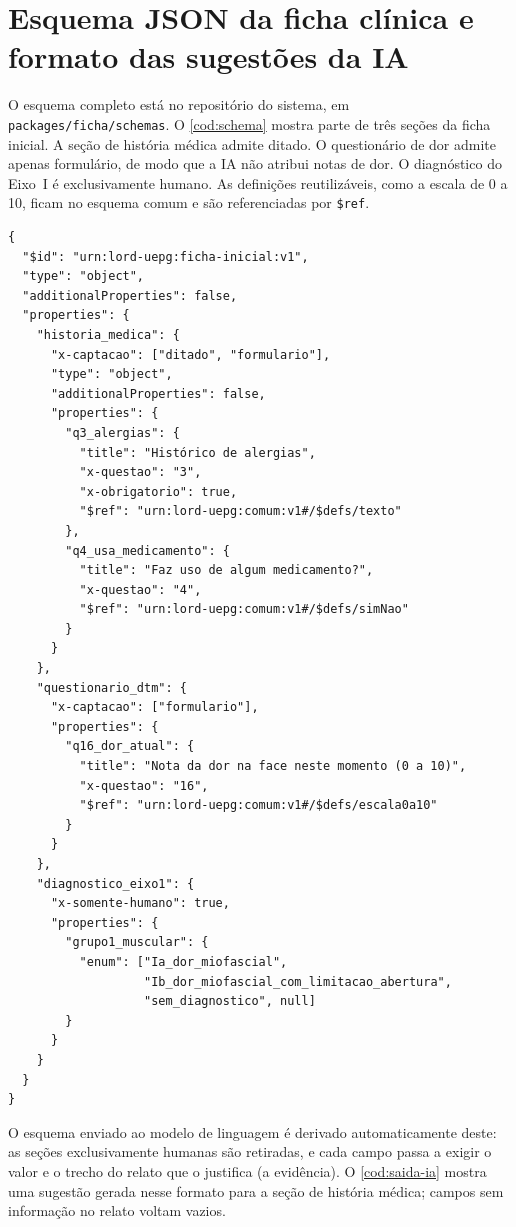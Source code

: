 \chapter{Esquema JSON da ficha clínica e formato das sugestões da IA}
\label{apendice:schema}

O esquema completo está no repositório do sistema, em \texttt{packages/ficha/schemas}. O \autoref{cod:schema} mostra parte de três seções da ficha inicial. A seção de história médica admite ditado. O questionário de dor admite apenas formulário, de modo que a IA não atribui notas de dor. O diagnóstico do Eixo~I é exclusivamente humano. As definições reutilizáveis, como a escala de 0 a 10, ficam no esquema comum e são referenciadas por \texttt{\$ref}.

\begin{lstlisting}[caption={Trecho do esquema da ficha inicial (versão 1)}, label=cod:schema]
{
  "$id": "urn:lord-uepg:ficha-inicial:v1",
  "type": "object",
  "additionalProperties": false,
  "properties": {
    "historia_medica": {
      "x-captacao": ["ditado", "formulario"],
      "type": "object",
      "additionalProperties": false,
      "properties": {
        "q3_alergias": {
          "title": "Histórico de alergias",
          "x-questao": "3",
          "x-obrigatorio": true,
          "$ref": "urn:lord-uepg:comum:v1#/$defs/texto"
        },
        "q4_usa_medicamento": {
          "title": "Faz uso de algum medicamento?",
          "x-questao": "4",
          "$ref": "urn:lord-uepg:comum:v1#/$defs/simNao"
        }
      }
    },
    "questionario_dtm": {
      "x-captacao": ["formulario"],
      "properties": {
        "q16_dor_atual": {
          "title": "Nota da dor na face neste momento (0 a 10)",
          "x-questao": "16",
          "$ref": "urn:lord-uepg:comum:v1#/$defs/escala0a10"
        }
      }
    },
    "diagnostico_eixo1": {
      "x-somente-humano": true,
      "properties": {
        "grupo1_muscular": {
          "enum": ["Ia_dor_miofascial",
                   "Ib_dor_miofascial_com_limitacao_abertura",
                   "sem_diagnostico", null]
        }
      }
    }
  }
}
\end{lstlisting}

O esquema enviado ao modelo de linguagem é derivado automaticamente deste: as seções exclusivamente humanas são retiradas, e cada campo passa a exigir o valor e o trecho do relato que o justifica (a evidência). O \autoref{cod:saida-ia} mostra uma sugestão gerada nesse formato para a seção de história médica; campos sem informação no relato voltam vazios.

